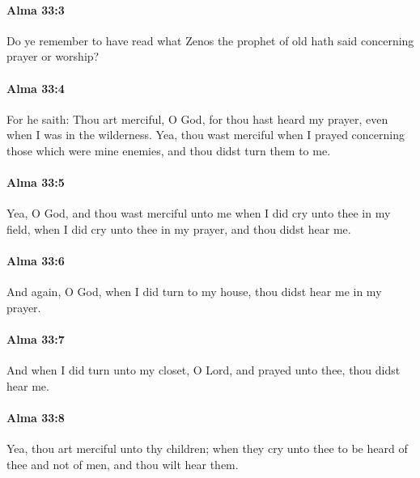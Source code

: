 		\paragraph{Alma 33:3} %
			\label{ALMA-33-3}

			Do ye remember to have read
			what Zenos the prophet of old hath said concerning prayer or worship?

		\paragraph{Alma 33:4} %
			\label{ALMA-33-4}

			For he saith:
			Thou art merciful, O God,
			for thou hast heard my prayer,
			even when I was in the wilderness.
			Yea, thou wast merciful
			when I prayed concerning those which were mine enemies,
			and thou didst turn them to me.

		\paragraph{Alma 33:5} %
			\label{ALMA-33-5}

			Yea, O God, and thou wast merciful unto me
			when I did cry unto thee in my field,
			when I did cry unto thee in my prayer,
			and thou didst hear me.

		\paragraph{Alma 33:6} %
			\label{ALMA-33-6}

			And again, O God, when I did turn to my house,
			thou didst hear me in my prayer.

		\paragraph{Alma 33:7} %
			\label{ALMA-33-7}

			And when I did turn unto my closet, O Lord,
			and prayed unto thee, thou didst hear me.

		\paragraph{Alma 33:8} %
			\label{ALMA-33-8}

			Yea, thou art merciful unto thy children;
			when they cry unto thee to be heard of thee and not of men,
			and thou wilt hear them.

